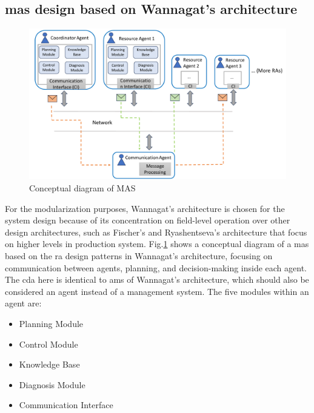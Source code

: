 \subsection{\gls{mas} design based on Wannagat's architecture}

\begin{figure}[htb]
\includegraphics[width=\textwidth]{figures/MAS_Conceptual_Diagram.pdf}
\centering
\caption{Conceptual diagram of MAS\label{fig: MASConceptual}}
\end{figure}

For the modularization purposes, Wannagat's architecture is chosen for the 
system design because of its concentration on field-level operation over other 
design architectures, such as Fischer’s and Ryashentseva’s architecture that focus 
on higher levels in production system.  
Fig.\ref{fig: MASConceptual} shows a conceptual diagram of a \gls{mas} based 
on the \gls{ra} design patterns 
in Wannagat’s architecture\cite{cruz_salazar_cyber-physical_2019}, 
focusing on communication between agents, 
planning, and decision-making inside each agent. The \gls{cda} here is identical 
to \gls{ams} of Wannagat’s architecture, which should also be considered an agent 
instead of a management system. The five modules within an agent are:

\begin{itemize}
    \item Planning Module
    \item Control Module
    \item Knowledge Base
    \item Diagnosis Module
    \item Communication Interface
\end{itemize}

